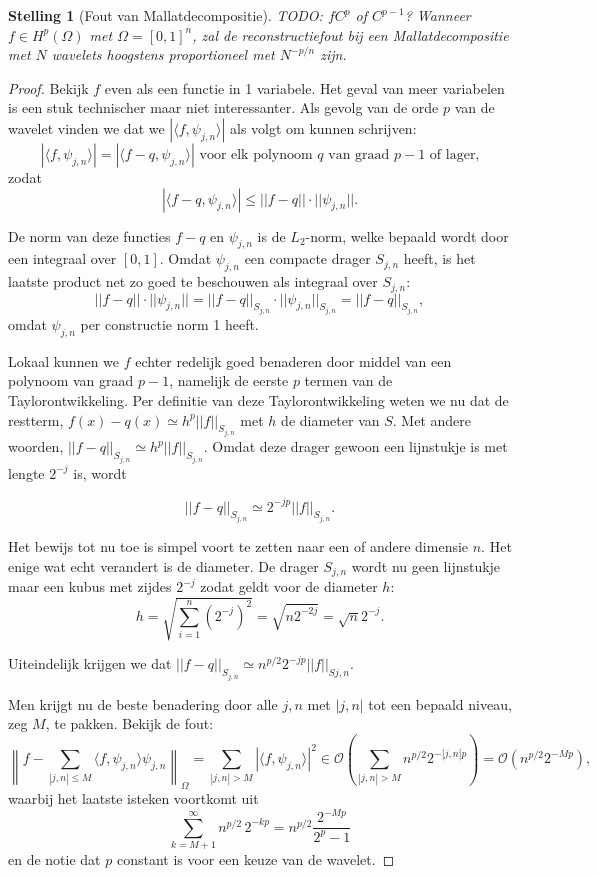 \documentclass[11pt]{amsart}
\newtheorem*{stelling}{Stelling}
\begin{document}
\begin{stelling}[Fout van Mallatdecompositie]
TODO: $f C^{p}$ of $C^{p-1}$?
Wanneer $f \in H^p(\Omega)$ met $\Omega = [0,1]^n$, zal de reconstructiefout bij een Mallatdecompositie met $N$ wavelets hoogstens proportioneel met $N^{-p/n}$ zijn.
\end{stelling}
\begin{proof}
  \iffalse
Bekijk $f$ even als een functie in 1 variabele. Het geval van meer variabelen is een stuk technischer maar niet interessanter.
Als gevolg van de orde $p$ van de wavelet vinden we dat we $|\langle f, \psi_{j,n}\rangle |$ als volgt om kunnen schrijven:
\[
	|\langle f, \psi_{j,n} \rangle | = |\langle f-q, \psi_{j,n} \rangle | \text{ voor elk polynoom $q$ van graad $p-1$ of lager,} 
\]
zodat
\[
	|\langle f-q, \psi_{j,n} \rangle | \leq ||f-q|| \cdot ||\psi_{j,n}||.
\]

De norm van deze functies $f-q$ en $\psi_{j,n}$ is de $L_2$-norm, welke bepaald wordt door een integraal over $[0,1]$. Omdat $\psi_{j,n}$ een compacte drager $S_{j,n}$ heeft, is het laatste product net zo goed te beschouwen als integraal over $S_{j,n}$:
\[
	||f-q|| \cdot ||\psi_{j,n}|| = ||f-q||_{S_{j,n}} \cdot ||\psi_{j,n}||_{S_{j,n}} = ||f-q||_{S_{j,n}},
\]
omdat $\psi_{j,n}$ per constructie norm 1 heeft.

Lokaal kunnen we $f$ echter redelijk goed benaderen door middel van een polynoom van graad $p-1$, namelijk de eerste $p$ termen van de Taylorontwikkeling. Per definitie van deze Taylorontwikkeling weten we nu dat de restterm, $f(x)-q(x) \simeq h^p||f||_{S_{j,n}}$ met $h$ de diameter van $S$.\cite[\S 31.\{3,4\}]{TODOross} Met andere woorden, $||f-q||_{S_{j,n}} \simeq h^p ||f||_{S_{j,n}}$. Omdat deze drager gewoon een lijnstukje is met lengte $2^{-j}$ is, wordt 

\[
	||f-q||_{S_{j,n}} \simeq 2^{-jp} ||f||_{S_{j,n}}.
\]

Het bewijs tot nu toe is simpel voort te zetten naar een of andere dimensie $n$. Het enige wat echt verandert is de diameter. De drager $S_{j,n}$ wordt nu geen lijnstukje maar een kubus met zijdes $2^{-j}$ zodat geldt voor de diameter $h$:
\[
	h = \sqrt{\sum_{i=1}^n (2^{-j})^2} = \sqrt{n 2^{-2j}} = \sqrt{n} 2^{-j}.
\]


Uiteindelijk krijgen we dat $||f-q||_{S_{j,n}} \simeq n^{p/2} 2^{-jp} ||f||_{S{j,n}}$.

Men krijgt nu de beste benadering door alle ${j,n}$ met $|{j,n}|$ tot een bepaald niveau, zeg $M$, te pakken. Bekijk de fout:
\[
	\left\| f - \sum_{|{j,n}| \leq M} \langle f, \psi_{j,n} \rangle \psi_{j,n} \right\|_\Omega = \sum_{|{j,n}| > M} | \langle f, \psi_{j,n} \rangle |^2 \in \mathcal{O}\left(\sum_{|{j,n}| > M} n^{p/2} 2^{-|{j,n}|p} \right) = \mathcal{O}(n^{p/2}2^{-Mp}),
\]
waarbij het laatste isteken voortkomt uit
\[
	\sum_{k=M+1}^\infty n^{p/2} \, 2^{- kp} = n^{p/2} \frac{2^{-Mp}}{2^p-1}
\]
en de notie dat $p$ constant is voor een keuze van de wavelet.


\end{proof}
\end{document}
